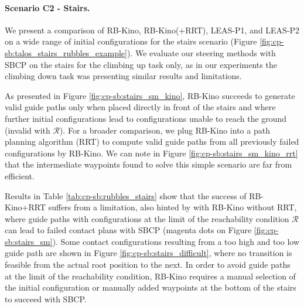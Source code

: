 
\paragraph{Scenario C2 - Stairs.\label{sec:cp-sb:par:stairs}}

We present a comparison of RB-Kino, RB-Kino(+RRT), LEAS-P1, and LEAS-P2 on a wide range of initial configurations for the stairs scenario (Figure \ref{fig:cp-sb:talos_stairs_rubbles_example}).
We evaluate our steering methods with SBCP on the stairs for the climbing up task only, as in our experiments the climbing down task was presenting similar results and limitations.

As presented in Figure \ref{fig:cp-sb:stairs_sm_kino}, RB-Kino succeeds to generate valid guide paths only when placed directly in front of the stairs and where further initial configurations lead to configurations unable to reach the ground (invalid with $\mathcal{R}$). 
For a broader comparison, we plug RB-Kino into a path planning algorithm (RRT) to compute valid guide paths from all previously failed configurations by RB-Kino.
We can note in Figure \ref{fig:cp-sb:stairs_sm_kino_rrt} that the intermediate waypoints found to solve this simple scenario are far from efficient.

Results in Table \ref{tab:cp-sb:rubbles_stairs} show that the success of RB-Kino+RRT suffers from a limitation, also hinted by with RB-Kino without RRT, where guide paths with configurations at the limit of the reachability condition $\mathcal{R}$ can lead to failed contact plans with SBCP (magenta dots on Figure \ref{fig:cp-sb:stairs_sm}).
Some contact configurations resulting from a too high and too low guide path are shown in Figure \ref{fig:cp-sb:stairs_difficult}, where no transition is feasible from the actual root position to the next.
In order to avoid guide paths at the limit of the reachability condition, RB-Kino requires a manual selection of the initial configuration or manually added waypoints at the bottom of the stairs to succeed with SBCP.

